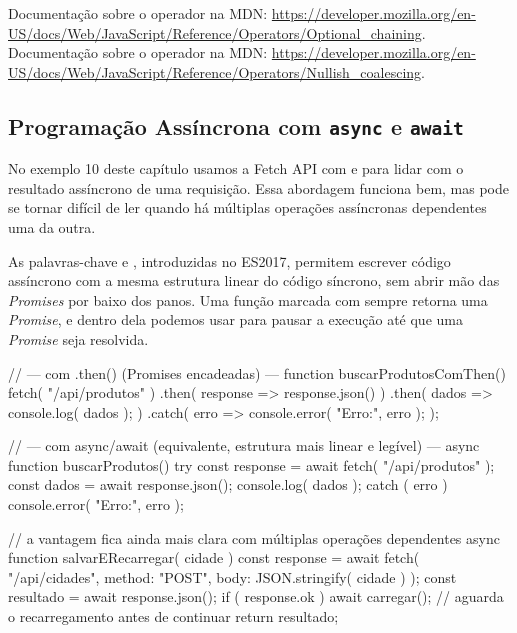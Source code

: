\begin{saibaMais}
    Documentação sobre o operador  na MDN: \url{https://developer.mozilla.org/en-US/docs/Web/JavaScript/Reference/Operators/Optional_chaining}.\\
    Documentação sobre o operador  na MDN: \url{https://developer.mozilla.org/en-US/docs/Web/JavaScript/Reference/Operators/Nullish_coalescing}.
\end{saibaMais}


\subsection{Programação Assíncrona com \texttt{async} e \texttt{await}}

No exemplo 10 deste capítulo usamos a Fetch API com  e  para lidar com o resultado assíncrono de uma requisição. Essa abordagem funciona bem, mas pode se tornar difícil de ler quando há múltiplas operações assíncronas dependentes uma da outra.

As palavras-chave  e , introduzidas no ES2017, permitem escrever código assíncrono com a mesma estrutura linear do código síncrono, sem abrir mão das \textit{Promises} por baixo dos panos. Uma função marcada com  sempre retorna uma \textit{Promise}, e dentro dela podemos usar  para pausar a execução até que uma \textit{Promise} seja resolvida.

\begin{boxJavaScriptCode}[title=async/await vs. Promises com .then()]
// --- com .then() (Promises encadeadas) ---
function buscarProdutosComThen() {
    fetch( "/api/produtos" )
        .then( response => response.json() )
        .then( dados => {
            console.log( dados );
        })
        .catch( erro => {
            console.error( "Erro:", erro );
        });
}

// --- com async/await (equivalente, estrutura mais linear e legível) ---
async function buscarProdutos() {
    try {
        const response = await fetch( "/api/produtos" );
        const dados = await response.json();
        console.log( dados );
    } catch ( erro ) {
        console.error( "Erro:", erro );
    }
}

// a vantagem fica ainda mais clara com múltiplas operações dependentes
async function salvarERecarregar( cidade ) {
    const response = await fetch( "/api/cidades", {
        method: "POST",
        body: JSON.stringify( cidade )
    });
    const resultado = await response.json();
    if ( response.ok ) {
        await carregar(); // aguarda o recarregamento antes de continuar
    }
    return resultado;
}
\end{boxJavaScriptCode}

